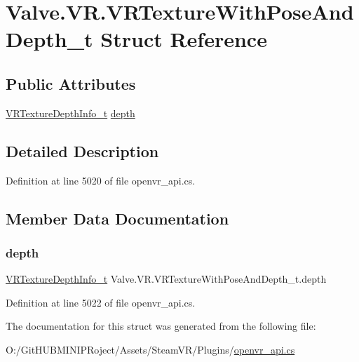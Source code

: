 \hypertarget{struct_valve_1_1_v_r_1_1_v_r_texture_with_pose_and_depth__t}{}\section{Valve.\+V\+R.\+V\+R\+Texture\+With\+Pose\+And\+Depth\+\_\+t Struct Reference}
\label{struct_valve_1_1_v_r_1_1_v_r_texture_with_pose_and_depth__t}
\subsection*{Public Attributes}
\begin{DoxyCompactItemize}
\item 
\mbox{\hyperlink{struct_valve_1_1_v_r_1_1_v_r_texture_depth_info__t}{V\+R\+Texture\+Depth\+Info\+\_\+t}} \mbox{\hyperlink{struct_valve_1_1_v_r_1_1_v_r_texture_with_pose_and_depth__t_ad45c9c1c38d1adb59f2ac43e58c01ee8}{depth}}
\end{DoxyCompactItemize}


\subsection{Detailed Description}


Definition at line 5020 of file openvr\+\_\+api.\+cs.



\subsection{Member Data Documentation}
\mbox{\label{struct_valve_1_1_v_r_1_1_v_r_texture_with_pose_and_depth__t_ad45c9c1c38d1adb59f2ac43e58c01ee8}} 
\subsubsection{\texorpdfstring{depth}{depth}}
{\footnotesize\ttfamily \mbox{\hyperlink{struct_valve_1_1_v_r_1_1_v_r_texture_depth_info__t}{V\+R\+Texture\+Depth\+Info\+\_\+t}} Valve.\+V\+R.\+V\+R\+Texture\+With\+Pose\+And\+Depth\+\_\+t.\+depth}



Definition at line 5022 of file openvr\+\_\+api.\+cs.



The documentation for this struct was generated from the following file\+:\begin{DoxyCompactItemize}
\item 
O\+:/\+Git\+H\+U\+B\+M\+I\+N\+I\+P\+Roject/\+Assets/\+Steam\+V\+R/\+Plugins/\mbox{\hyperlink{openvr__api_8cs}{openvr\+\_\+api.\+cs}}\end{DoxyCompactItemize}
